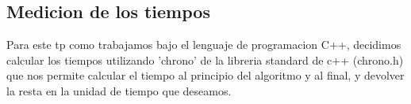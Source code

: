 \subsection{Medicion de los tiempos}

Para este tp como trabajamos bajo el lenguaje de programacion C++, decidimos calcular los tiempos utilizando 'chrono' de la libreria standard de c++ (chrono.h) que nos permite calcular el tiempo al principio del algoritmo y al final, y devolver la resta en la unidad de tiempo que deseamos.\\ \\


% 

% 

% 

